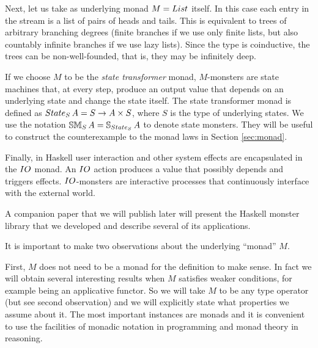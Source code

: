 \begin{example}
Next, let us take as underlying monad $M = \lstsym $ itself.
In this case each entry in the stream is a list of pairs of heads and tails.
This is equivalent to trees of arbitrary branching degrees (finite branches if we use only finite lists, but also countably infinite branches if we use lazy lists).
Since the type is coinductive, the trees can be non-well-founded, that is, they may be infinitely deep.
\end{example}

\begin{example}
If we choose $M$ to be the {\em state transformer} monad, $M$-monsters are state machines that, at every step, produce an output value that depends on an underlying state and change the state itself.
The state transformer monad is defined as $\state_S\,A = S\rightarrow A\times S$, where $S$ is the type of underlying states.
We use the notation $\stmon{S}\,A = \stream{\state_S}\,A$ to denote state monsters.
They will be useful to construct the counterexample to the monad laws in Section \ref{sec:monad}.
\end{example}

\begin{example}
Finally, in Haskell user interaction and other system effects are encapsulated in the $\io$ monad. An $\io$ action produces a value that possibly depends and triggers effects. $\io$-monsters are interactive processes that continuously interface with the external world.
\end{example}

A companion paper that we will publish later will present the Haskell monster library that we developed and describe several of its applications.

It is important to make two observations about the underlying ``monad'' $M$.

First, $M$ does not need to be a monad for the definition to make sense. 
In fact we will obtain several interesting results when $M$ satisfies weaker conditions, for example being an applicative functor.
So we will take $M$ to be any type operator (but see second observation) and we will explicitly state what properties we assume about it.
The most important instances are monads and it is convenient to use the facilities of monadic notation in programming and monad theory in reasoning.

